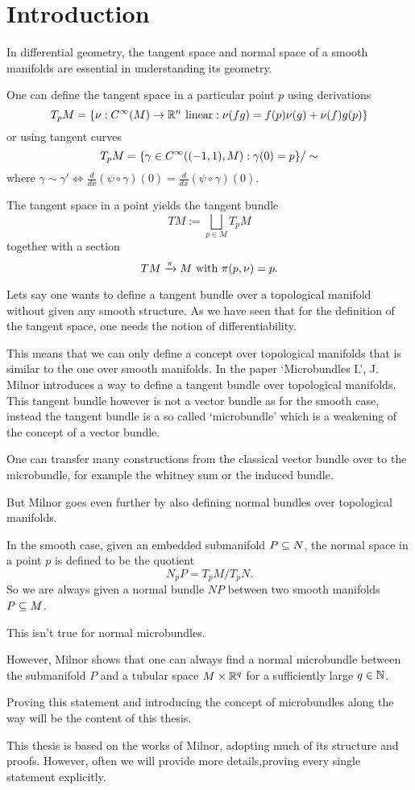 \chapter{Introduction}\label{chapter::introduction}

\begin{myparagraph}
    In differential geometry,
    the tangent space and normal space of a smooth manifolds are
    essential in understanding its geometry.

    One can define the tangent space
    in a particular point $p$ using derivations
    \[ T_p M = \{\nu: C^\infty(M) \to \mathbb{R}^n \text{ linear}:\nu(fg) = f(p)\nu(g) + \nu(f)g(p)\} \]    
    or using tangent curves
    \[ T_p M = \{\gamma \in C^\infty((-1, 1), M):\gamma(0) = p \} / \sim \]
    where $\gamma \sim \gamma' \iff \frac{d}{dx}(\psi \circ \gamma)(0) = \frac{d}{dx}(\psi \circ \gamma)(0)$.
    
    The tangent space in a point yields the tangent bundle
    \[ TM := \bigsqcup_{p \in M} T_p M\]
    together with a section
    \[ TM \xrightarrow{\pi} M \text{ with } \pi(p, \nu) = p. \]

    Lets say one wants to define a tangent bundle over a topological manifold
    without given any smooth structure.
    As we have seen that for the definition of the tangent space,
    one needs the notion of differentiability.

    This means that we can only define a concept over topological manifolds
    that is similar to the one over smooth manifolds.
    In the paper `Microbundles I.', J. Milnor introduces a way
    to define a tangent bundle over topological manifolds.
    This tangent bundle however is not a vector bundle as for the smooth case,
    instead the tangent bundle is a so called `microbundle' which is a weakening of
    the concept of a vector bundle.

    One can transfer many constructions from the classical vector bundle over to the microbundle,
    for example the whitney sum or the induced bundle. 

    But Milnor goes even further by also defining
    normal bundles over topological manifolds.

    In the smooth case, given an embedded submanifold $P \subseteq{} N$,
    the normal space in a point $p$
    is defined to be the quotient
    \[ N_p P = T_p M / T_p N. \]
    So we are always given a normal bundle $NP$ between two smooth manifolds $P \subseteq{} M$.

    This isn't true for normal microbundles.

    However, Milnor shows that one can always find a normal microbundle
    between the submanifold $P$ and a tubular space $M \times \mathbb{R}^q$
    for a sufficiently large $q \in \mathbb{N}$.

    Proving this statement and introducing the concept of
    microbundles along the way will be the content of this thesis.

    This thesis is based on the works of Milnor,
    adopting much of its structure and proofs.
    However, often we will provide more details,proving every single statement explicitly.
\end{myparagraph}